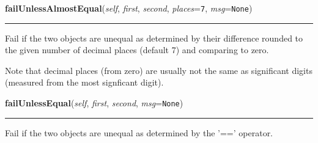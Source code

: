     \label{unittest:TestCase:failUnlessAlmostEqual}

    \vspace{0.5ex}

    \begin{boxedminipage}{\textwidth}

    \raggedright \textbf{failUnlessAlmostEqual}(\textit{self}, \textit{first}, \textit{second}, \textit{places}=\texttt{7}, \textit{msg}=\texttt{None})

    \vspace{-1.5ex}

    \rule{\textwidth}{0.5\fboxrule}
    Fail if the two objects are unequal as determined by their difference 
    rounded to the given number of decimal places (default 7) and comparing
    to zero.

    Note that decimal places (from zero) are usually not the same as 
    significant digits (measured from the most signficant digit).

    \vspace{1ex}

    \end{boxedminipage}

    \label{unittest:TestCase:failUnlessEqual}

    \vspace{0.5ex}

    \begin{boxedminipage}{\textwidth}

    \raggedright \textbf{failUnlessEqual}(\textit{self}, \textit{first}, \textit{second}, \textit{msg}=\texttt{None})

    \vspace{-1.5ex}

    \rule{\textwidth}{0.5\fboxrule}
    Fail if the two objects are unequal as determined by the '==' operator.

    \vspace{1ex}

    \end{boxedminipage}

    \label{unittest:TestCase:failUnlessRaises}

    \vspace{0.5ex}

